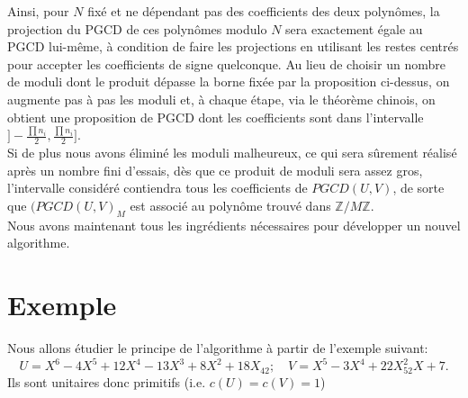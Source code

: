 \documentclass[12pt]{report}
\begin{document}
Ainsi, pour $N$ fixé et ne dépendant pas des coefficients des deux polynômes, la projection du PGCD de ces polynômes modulo $N$ sera exactement égale au PGCD lui-même, à condition de faire les projections en utilisant les restes centrés pour accepter les coefficients de signe quelconque. Au lieu de choisir un nombre de moduli dont le produit dépasse la borne fixée par la proposition ci-dessus, on augmente pas à pas les moduli et, à chaque étape, via le théorème chinois, on obtient une proposition de PGCD dont les coefficients sont dans l'intervalle $] -\tfrac{\prod n_i}{2}, \tfrac{\prod n_i}{2} ]$. \\

Si de plus nous avons éliminé les moduli malheureux, ce qui sera sûrement réalisé après un nombre fini d'essais, dès que ce produit de moduli sera assez gros, l'intervalle considéré contiendra tous les coefficients de $PGCD(U,V)$, de sorte que $(PGCD(U,V)_M$ est associé au polynôme trouvé dans $\mathbb{Z}/M\mathbb{Z}$.\\

Nous avons maintenant tous les ingrédients nécessaires pour développer un nouvel algorithme.


\section*{Exemple}

Nous allons étudier le principe de l'algorithme à partir de l'exemple suivant:
$$    U=X^6-4X^5 +12X^4  -13 X^3 +8X^2  +18 X _42; \quad  V= X^5 -3X^4  +22 X^2 _52 X +7  . $$
Ils sont unitaires donc primitifs (i.e. $c(U)=c(V)=1$)
\end{document}
